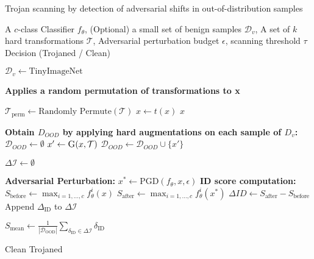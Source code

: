 \begin{algorithm}
\caption{Trojan scanning by detection of adversarial shifts in out-of-distribution samples}
\label{app:alg}

\begin{algorithmic}[1] %
\Require A $c$-class Classifier $f_\theta$, (Optional) a small set of benign samples $\mathcal{D}_{v}$, A set of $k$ hard transformations $\mathcal{T}$, Adversarial perturbation budget $\epsilon$, scanning threshold $\tau$
\Ensure Decision (Trojaned / Clean)

    \State $\mathcal{D}_{v} \leftarrow \text{TinyImageNet}$
\EndIf

\State \textbf{Applies a random permutation of transformations to x}

    \State $\mathcal{T}_{\text{perm}} \leftarrow \text{Randomly Permute}(\mathcal{T})$ 
        \State $x \leftarrow t(x)$
    \EndFor
    \State \Return $x$
\EndProcedure

\State \textbf{Obtain $D_{OOD}$ by applying hard augmentations on each sample of $D_v$:}    
\State $\mathcal{D}_{OOD} \leftarrow \emptyset$ 
    \State $x' \leftarrow \Call{G}{x, \mathcal{T}}$ \State $\mathcal{D}_{OOD} \leftarrow \mathcal{D}_{OOD} \cup \{x'\}$
\EndFor

\State $\Delta \mathcal{I} \leftarrow \emptyset$ 

    \State \textbf{Adversarial Perturbation:}
    \State $x^* \leftarrow \text{PGD}(f_\theta, x, \epsilon)$ \State \textbf{ID score computation:}
    \State $S_{\text{before}} \leftarrow \max_{i=1,\ldots,c} f_\theta^i(x)$
    \State $S_{\text{after}} \leftarrow \max_{i=1,\ldots,c} f_\theta^i(x^*)$
    \State $\Delta ID \leftarrow S_{\text{after}} - S_{\text{before}}$
    \State Append $\Delta_{\text{ID}}$ to $\Delta \mathcal{I}$
\EndFor

\State $S_{\text{mean}} \leftarrow \frac{1}{|\mathcal{D}_{\text{OOD}}|} \sum_{\delta_{\text{ID}} \in \Delta \mathcal{I}} \delta_{\text{ID}}$

    \State \Return Clean
\Else
    \State \Return Trojaned
\EndIf
\end{algorithmic}
\end{algorithm}


   

